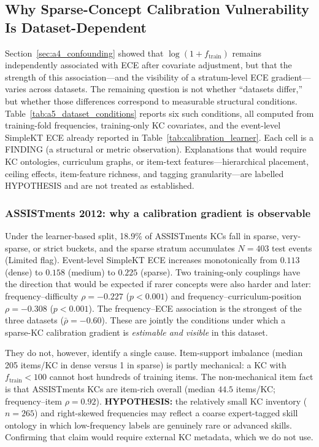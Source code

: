 \subsection{Why Sparse-Concept Calibration Vulnerability Is Dataset-Dependent}
\label{sec:a5_dataset_dependent}

Section~\ref{sec:a4_confounding} showed that $\log(1+f_{\mathrm{train}})$ remains independently associated with ECE after covariate adjustment, but that the strength of this association---and the visibility of a stratum-level ECE gradient---varies across datasets.
The remaining question is not whether ``datasets differ,'' but whether those differences correspond to measurable structural conditions.
Table~\ref{tab:a5_dataset_conditions} reports six such conditions, all computed from training-fold frequencies, training-only KC covariates, and the event-level SimpleKT ECE already reported in Table~\ref{tab:calibration_learner}.
Each cell is a FINDING (a structural or metric observation).
Explanations that would require KC ontologies, curriculum graphs, or item-text features---hierarchical placement, ceiling effects, item-feature richness, and tagging granularity---are labelled HYPOTHESIS and are not treated as established.

\subsubsection*{ASSISTments 2012: why a calibration gradient is observable}
Under the learner-based split, 18.9\% of ASSISTments KCs fall in sparse, very-sparse, or strict buckets, and the sparse stratum accumulates $N=403$ test events (Limited flag).
Event-level SimpleKT ECE increases monotonically from $0.113$ (dense) to $0.158$ (medium) to $0.225$ (sparse).
Two training-only couplings have the direction that would be expected if rarer concepts were also harder and later: frequency--difficulty $\rho=-0.227$ ($p<0.001$) and frequency--curriculum-position $\rho=-0.308$ ($p<0.001$).
The frequency--ECE association is the strongest of the three datasets ($\bar{\rho}=-0.60$).
These are jointly the conditions under which a sparse-KC calibration gradient is \emph{estimable and visible} in this dataset.

They do not, however, identify a single cause.
Item-support imbalance (median 205 items/KC in dense versus 1 in sparse) is partly mechanical: a KC with $f_{\mathrm{train}}<100$ cannot host hundreds of training items.
The non-mechanical item fact is that ASSISTments KCs are item-rich overall (median $44.5$ items/KC; frequency--item $\rho=0.92$).
\textbf{HYPOTHESIS:} the relatively small KC inventory ($n=265$) and right-skewed frequencies may reflect a coarse expert-tagged skill ontology in which low-frequency labels are genuinely rare or advanced skills.
Confirming that claim would require external KC metadata, which we do not use.

